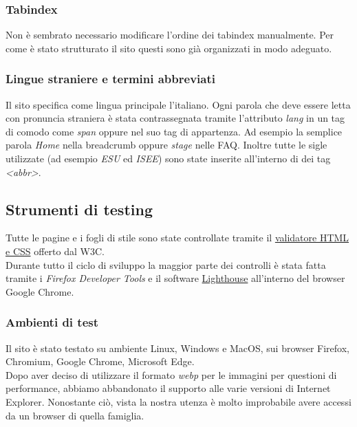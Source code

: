 \subsubsection{Tabindex}
Non è sembrato necessario modificare l'ordine dei tabindex manualmente. Per come è stato strutturato il sito questi sono già organizzati in modo adeguato.

\subsubsection{Lingue straniere e termini abbreviati}
Il sito specifica come lingua principale l'italiano. Ogni parola che deve essere letta con pronuncia straniera è stata contrassegnata tramite l'attributo \textit{lang} in un tag di comodo come \textit{span} oppure nel suo tag di appartenza. Ad esempio la semplice parola \textit{Home} nella breadcrumb oppure \textit{stage} nelle FAQ. Inoltre tutte le sigle utilizzate (ad esempio \textit{ESU} ed \textit{ISEE}) sono state inserite all'interno di dei tag \textit{<abbr>}.

\subsection{Strumenti di testing}

Tutte le pagine e i fogli di stile sono state controllate tramite il \href{https://validator.w3.org/}{validatore HTML e CSS} offerto dal W3C.\\
Durante tutto il ciclo di sviluppo la maggior parte dei controlli è stata fatta tramite i \textit{Firefox Developer Tools} e il software \href{https://developers.google.com/web/tools/lighthouse}{Lighthouse} all'interno del browser Google Chrome.

\subsubsection{Ambienti di test}
Il sito è stato testato su ambiente Linux, Windows e MacOS, sui browser Firefox, Chromium, Google Chrome, Microsoft Edge.\\
Dopo aver deciso di utilizzare il formato \textit{webp} per le immagini per questioni di performance, abbiamo abbandonato il supporto alle varie versioni di Internet Explorer. Nonostante ciò, vista la nostra utenza è molto improbabile avere accessi da un browser di quella famiglia.\\

